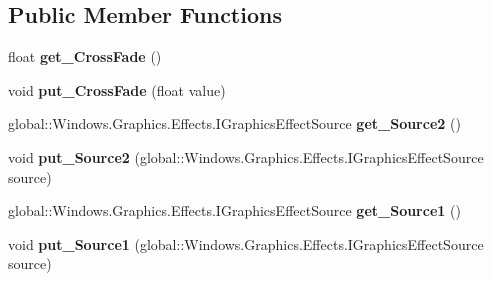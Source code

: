 \subsection*{Public Member Functions}
\begin{DoxyCompactItemize}
\item 
\mbox{\label{interface_microsoft_1_1_graphics_1_1_canvas_1_1_effects_1_1_i_cross_fade_effect_af6d5c5f211f2a0d5dcebe870e4d0faa4}} 
float {\bfseries get\+\_\+\+Cross\+Fade} ()
\item 
\mbox{\label{interface_microsoft_1_1_graphics_1_1_canvas_1_1_effects_1_1_i_cross_fade_effect_a77159b902468d05e9b4edbd38789bea7}} 
void {\bfseries put\+\_\+\+Cross\+Fade} (float value)
\item 
\mbox{\label{interface_microsoft_1_1_graphics_1_1_canvas_1_1_effects_1_1_i_cross_fade_effect_aa4046ab138ef0fb93560d9f74875b5fb}} 
global\+::\+Windows.\+Graphics.\+Effects.\+I\+Graphics\+Effect\+Source {\bfseries get\+\_\+\+Source2} ()
\item 
\mbox{\label{interface_microsoft_1_1_graphics_1_1_canvas_1_1_effects_1_1_i_cross_fade_effect_ae9a7ddede25c924649cded934e81b457}} 
void {\bfseries put\+\_\+\+Source2} (global\+::\+Windows.\+Graphics.\+Effects.\+I\+Graphics\+Effect\+Source source)
\item 
\mbox{\label{interface_microsoft_1_1_graphics_1_1_canvas_1_1_effects_1_1_i_cross_fade_effect_a6cf8a47d6e17902e59cbfba37f8bc6d4}} 
global\+::\+Windows.\+Graphics.\+Effects.\+I\+Graphics\+Effect\+Source {\bfseries get\+\_\+\+Source1} ()
\item 
\mbox{\label{interface_microsoft_1_1_graphics_1_1_canvas_1_1_effects_1_1_i_cross_fade_effect_aa61455b872f1f3db557618ac68112384}} 
void {\bfseries put\+\_\+\+Source1} (global\+::\+Windows.\+Graphics.\+Effects.\+I\+Graphics\+Effect\+Source source)

\end{DoxyCompactItemize}
